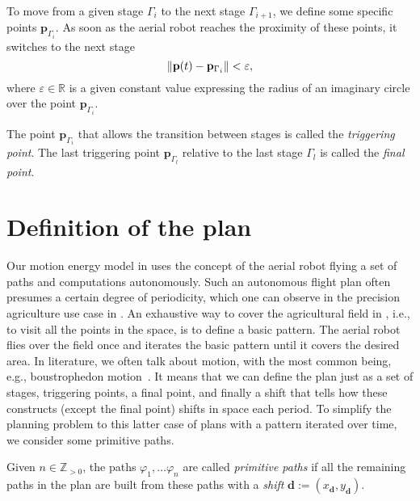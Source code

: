 To move from a given stage $\Gamma_i$ to the next stage $\Gamma_{i+1}$, we define some specific points $\mathbf{p}_{\Gamma_i}$. As soon as the aerial robot reaches the proximity of these points, it switches to the next stage
\begin{equation}\label{eq:trig-vareps}
  \left\lVert\mathbf{p}(t)-\mathbf{p}_{\Gamma_i}\right\rVert<\varepsilon,
\end{equation}
where $\varepsilon\in\mathbb{R}$ is a given constant value expressing the radius of an imaginary circle over the point $\mathbf{p}_{\Gamma_i}$.

\begin{defn}
  \label{def:trigs}
  The point $\mathbf{p}_{\Gamma_{i}}$ that allows the transition between stages is called the \emph{triggering point}. The last triggering point $\mathbf{p}_{\Gamma_{l}}$ relative to the last stage $\Gamma_l$ is called the \emph{final point}.
\end{defn}


\section{Definition of the plan}
\label{sec:plan}

Our motion energy model in  uses the concept of the aerial robot flying a set of paths and computations autonomously. Such an autonomous flight plan often presumes a certain degree of periodicity, which one can observe in the precision agriculture use case in . An exhaustive way to cover the agricultural field in , i.e., to visit all the points in the space, is to define a basic pattern. The aerial robot flies over the field once and iterates the basic pattern until it covers the desired area. In literature, we often talk about motion, with the most common being, e.g., boustrophedon motion~\citep{choset2005principles,choset2001coverage,cabreira2019survey,galceran2013survey}. It means that we can define the plan just as a set of stages, triggering points, a final point, and finally a shift that tells how these constructs (except the final point) shifts in space each period. To simplify the planning problem to this latter case of plans with a pattern iterated over time, we consider some primitive paths.

\begin{defn}
  \label{def:primitive}
  Given $n\in\mathbb{Z}_{>0}$, the paths $\varphi_1,\dots\varphi_n$ are called \emph{primitive paths} if all the remaining paths in the plan are built from these paths with a \emph{shift} $\mathbf{d}:=(x_{\mathbf{d}},y_{\mathbf{d}})$. 
\end{defn}

